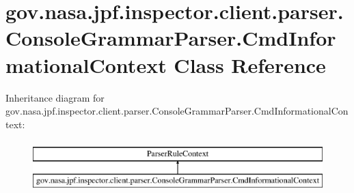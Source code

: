 \hypertarget{classgov_1_1nasa_1_1jpf_1_1inspector_1_1client_1_1parser_1_1_console_grammar_parser_1_1_cmd_informational_context}{}\section{gov.\+nasa.\+jpf.\+inspector.\+client.\+parser.\+Console\+Grammar\+Parser.\+Cmd\+Informational\+Context Class Reference}
\label{classgov_1_1nasa_1_1jpf_1_1inspector_1_1client_1_1parser_1_1_console_grammar_parser_1_1_cmd_informational_context}
Inheritance diagram for gov.\+nasa.\+jpf.\+inspector.\+client.\+parser.\+Console\+Grammar\+Parser.\+Cmd\+Informational\+Context\+:\begin{figure}[H]
\begin{center}
\leavevmode
\includegraphics[height=2.000000cm]{classgov_1_1nasa_1_1jpf_1_1inspector_1_1client_1_1parser_1_1_console_grammar_parser_1_1_cmd_informational_context}
\end{center}
\end{figure}
